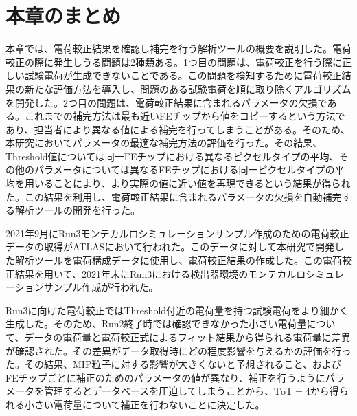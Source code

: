 \section{本章のまとめ}
本章では、電荷較正結果を確認し補完を行う解析ツールの概要を説明した。電荷較正の際に発生しうる問題は2種類ある。1つ目の問題は、電荷較正を行う際に正しい試験電荷が生成できないことである。この問題を検知するために電荷較正結果の新たな評価方法を導入し、問題のある試験電荷を順に取り除くアルゴリズムを開発した。2つ目の問題は、電荷較正結果に含まれるパラメータの欠損である。これまでの補完方法は最も近いFEチップから値をコピーするという方法であり、担当者により異なる値による補完を行ってしまうことがある。そのため、本研究においてパラメータの最適な補完方法の評価を行った。その結果、Threshold値については同一FEチップにおける異なるピクセルタイプの平均、その他のパラメータについては異なるFEチップにおける同一ピクセルタイプの平均を用いることにより、より実際の値に近い値を再現できるという結果が得られた。この結果を利用し、電荷較正結果に含まれるパラメータの欠損を自動補完する解析ツールの開発を行った。

2021年9月にRun3モンテカルロシミュレーションサンプル作成のための電荷較正データの取得がATLASにおいて行われた。このデータに対して本研究で開発した解析ツールを電荷構成データに使用し、電荷較正結果の作成した。この電荷較正結果を用いて、2021年末にRun3における検出器環境のモンテカルロシミュレーションサンプル作成が行われた。

Run3に向けた電荷較正ではThreshold付近の電荷量を持つ試験電荷をより細かく生成した。そのため、Run2終了時では確認できなかった小さい電荷量について、データの電荷量と電荷較正式によるフィット結果から得られる電荷量に差異が確認された。その差異がデータ取得時にどの程度影響を与えるかの評価を行った。その結果、MIP粒子に対する影響が大きくないと予想されること、およびFEチップごとに補正のためのパラメータの値が異なり、補正を行うようにパラメータを管理するとデータベースを圧迫してしまうことから、$\mathrm{ToT}=4$から得られる小さい電荷量について補正を行わないことに決定した。




\newpage
